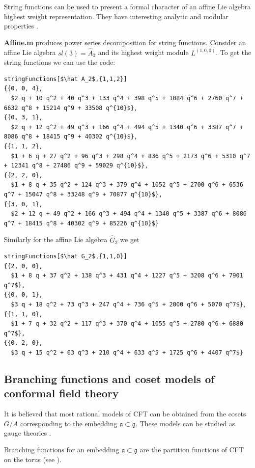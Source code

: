 \documentclass[preprint,12pt]{elsarticle}
\newcommand{\gf}{\mathfrak{g}}
\newcommand{\af}{\mathfrak{a}}
\begin{document}
String functions can be used to present a formal character of an affine Lie algebra highest weight representation. They have interesting analytic and modular properties \cite{kac1990idl,kac1988modular,kac1984infinite}.

{\bf Affine.m} produces power series decomposition for string functions. Consider an affine Lie algebra $\hat{sl(3)}=\hat A_{2}$ and its highest weight module $L^{(1,0,0)}$. To get the string functions we can use the code:
\begin{lstlisting}[mathescape=true]
stringFunctions[$\hat A_2$,{1,1,2}]
{{0, 0, 4}, 
  $2 q + 10 q^2 + 40 q^3 + 133 q^4 + 398 q^5 + 1084 q^6 + 2760 q^7 + 6632 q^8 + 15214 q^9 + 33508 q^{10}$}, 
{{0, 3, 1}, 
  $2 q + 12 q^2 + 49 q^3 + 166 q^4 + 494 q^5 + 1340 q^6 + 3387 q^7 + 8086 q^8 + 18415 q^9 + 40302 q^{10}$}, 
{{1, 1, 2}, 
  $1 + 6 q + 27 q^2 + 96 q^3 + 298 q^4 + 836 q^5 + 2173 q^6 + 5310 q^7 + 12341 q^8 + 27486 q^9 + 59029 q^{10}$}, 
{{2, 2, 0}, 
  $1 + 8 q + 35 q^2 + 124 q^3 + 379 q^4 + 1052 q^5 + 2700 q^6 + 6536 q^7 + 15047 q^8 + 33248 q^9 + 70877 q^{10}$}, 
{{3, 0, 1}, 
  $2 + 12 q + 49 q^2 + 166 q^3 + 494 q^4 + 1340 q^5 + 3387 q^6 + 8086 q^7 + 18415 q^8 + 40302 q^9 + 85226 q^{10}$}
\end{lstlisting}
Similarly for the affine Lie algebra $\hat G_{2}$ we get
\begin{lstlisting}[mathescape=true]
stringFunctions[$\hat G_2$,{1,1,0}]
{{2, 0, 0}, 
  $1 + 8 q + 37 q^2 + 138 q^3 + 431 q^4 + 1227 q^5 + 3208 q^6 + 7901 q^7$}, 
{{0, 0, 1}, 
  $3 q + 18 q^2 + 73 q^3 + 247 q^4 + 736 q^5 + 2000 q^6 + 5070 q^7$}, 
{{1, 1, 0},
  $1 + 7 q + 32 q^2 + 117 q^3 + 370 q^4 + 1055 q^5 + 2780 q^6 + 6880 q^7$}, 
{{0, 2, 0}, 
  $3 q + 15 q^2 + 63 q^3 + 210 q^4 + 633 q^5 + 1725 q^6 + 4407 q^7$}
\end{lstlisting}

\subsection{Branching functions and coset models of conformal field theory}
\label{sec:branch-funct-coset}

It is believed that most rational models of CFT can be obtained from the cosets $G/A$ corresponding to the embedding $\af\subset\gf$. These models can be studied as gauge theories \cite{Hwang:1994yr, hwang1993brst}.

Branching functions for an embedding $\af\subset\gf$ are the partition functions of CFT on the torus (see \cite{difrancesco1997cft}).
\end{document}
